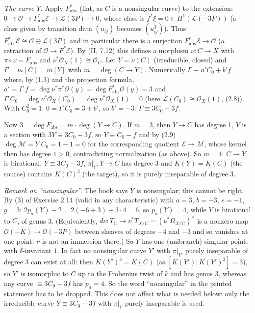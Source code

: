 \documentclass[11pt]{article}
\begin{document}
\emph{The curve $Y$.} Apply $F_{\operatorname{abs}}^*$ (flat, as $C$ is a nonsingular curve) to the extension: $0\to\mathcal O\to F^*_{\operatorname{abs}}\mathcal E\to\mathcal L(3P)\to0$, whose class is $f^*\xi=0\in H^1(\mathcal L(-3P))$ (a class given by transition data $(u_{ij})$ becomes $(u_{ij}^3)$). Thus $F_{\operatorname{abs}}^*\mathcal E\cong\mathcal O\oplus\mathcal L(3P)$ and in particular there is a surjection $F_{\operatorname{abs}}^*\mathcal E\to\mathcal O$ (a retraction of $\mathcal O\to F^*\mathcal E$). By (II, 7.12) this defines a morphism $\nu\colon C\to X$ with $\pi\circ\nu=F_{\operatorname{abs}}$ and $\nu^*\mathcal O_X(1)\cong\mathcal O_C$. Let $Y=\nu(C)$ (irreducible, closed) and $\Gamma=\nu_*[C]=m[Y]$ with $m=\deg(C\to Y)$. Numerically $\Gamma\equiv a'C_0+b'f$ where, by (1.3) and the projection formula, $a'=\Gamma.f=\deg\nu^*\pi^*\mathcal O(y)=\deg F^*_{\operatorname{abs}}\mathcal O(y)=3$ and $\Gamma.C_0=\deg\nu^*\mathcal O_X(C_0)=\deg\nu^*\mathcal O_X(1)=0$ (here $\mathcal L(C_0)\cong\mathcal O_X(1)$, (2.8)). With $C_0^2=1$: $0=\Gamma.C_0=3+b'$, so $b'=-3$: $\Gamma\equiv3C_0-3f$.

Now $3=\deg F_{\operatorname{abs}}=m\cdot\deg(Y\to C)$. If $m=3$, then $Y\to C$ has degree 1, $Y$ is a section with $3Y\equiv3C_0-3f$, so $Y\equiv C_0-f$ and by (2.9) $\deg\mathcal M=Y.C_0=1-1=0$ for the corresponding quotient $\mathcal E\to\mathcal M$, whose kernel then has degree $1>0$, contradicting normalization (as above). So $m=1$: $C\to Y$ is birational, $Y\equiv3C_0-3f$, $\pi|_Y\colon Y\to C$ has degree 3 and $K(Y)=K(C)$ (the source) contains $K(C)^3$ (the target), so it is purely inseparable of degree 3.

\emph{Remark on ``nonsingular''.} The book says $Y$ is nonsingular; this cannot be right. By (3) of Exercise 2.14 (valid in any characteristic) with $a=3$, $b=-3$, $e=-1$, $g=3$: $2p_a(Y)-2=2(-6+3)+3\cdot4=6$, so $p_a(Y)=4$, while $Y$ is birational to $C$, of genus 3. (Equivalently, $d\nu\colon T_C\to\nu^*T_{X/C}=(\nu^*\Omega_{X/C})^\vee$ is a nonzero map $\mathcal O(-K)\to\mathcal O(-3P)$ between sheaves of degrees $-4$ and $-3$ and so vanishes at one point: $\nu$ is not an immersion there.) So $Y$ has one (unibranch) singular point, with $\delta$-invariant $1$. In fact no nonsingular curve $Y'$ with $\pi|_{Y'}$ purely inseparable of degree $3$ can exist at all: then $K(Y')^3=K(C)$ (as $[K(Y'):K(Y')^3]=3$), so $Y'$ is isomorphic to $C$ up to the Frobenius twist of $k$ and has genus $3$, whereas any curve $\equiv3C_0-3f$ has $p_a=4$. So the word ``nonsingular'' in the printed statement has to be dropped. This does not affect what is needed below: only the irreducible curve $Y\equiv3C_0-3f$ with $\pi|_Y$ purely inseparable is used.
\end{document}
